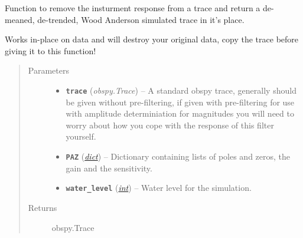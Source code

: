 \documentclass[a4paper,10pt,english]{sphinxmanual}
\begin{document}
\begin{fulllineitems}
\label{submodules/utils.mag_calc:mag_calc._sim_WA}
Function to remove the insturment response from a trace and return a
de-meaned, de-trended, Wood Anderson simulated trace in it's place.

Works in-place on data and will destroy your original data, copy the
trace before giving it to this function!
\begin{quote}\begin{description}
\item[{Parameters}] \leavevmode\begin{itemize}
\item {} 
\textbf{\texttt{trace}} (\emph{obspy.Trace}) -- A standard obspy trace, generally should be given without
pre-filtering, if given with pre-filtering for use with
amplitude determiniation for magnitudes you will need to
worry about how you cope with the response of this filter
yourself.

\item {} 
\textbf{\texttt{PAZ}} (\href{https://docs.python.org/library/stdtypes.html\#dict}{\emph{dict}}) -- Dictionary containing lists of poles and zeros, the gain and
the sensitivity.

\item {} 
\textbf{\texttt{water\_level}} (\href{https://docs.python.org/library/functions.html\#int}{\emph{int}}) -- Water level for the simulation.

\end{itemize}

\item[{Returns}] \leavevmode
obspy.Trace

\end{description}\end{quote}

\end{fulllineitems}

\end{document}
